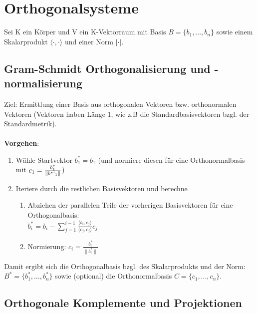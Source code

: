 \documentclass[10pt,a4paper]{article}
\newcommand{\norm}[1]{\lVert#1\rVert}
\begin{document}
	\newpage
	\section{Orthogonalsysteme}
	\label{os:sec:orthogonalsysteme}
	
	Sei K ein Körper und V ein K-Vektorraum mit Basis $B = \{b_1, ..., b_n\}$ sowie einem Skalarprodukt $\langle \cdot, \cdot\rangle$ und einer Norm $|\cdot|$.
	
	\subsection{Gram-Schmidt Orthogonalisierung und -normalisierung}
	\label{os:sub:gram_schmidt_orthogonalisierung_und_normalisierung}
	
	Ziel: Ermittlung einer Basis aus orthogonalen Vektoren bzw. orthonormalen Vektoren (Vektoren haben Länge 1, wie z.B die Standardbasisvektoren bzgl. der Standardmetrik).\\\\
	\textbf{Vorgehen}:
	\begin{enumerate}
		\item Wähle Startvektor $b^*_1 = b_1$ (und normiere diesen für eine Orthonormalbasis mit $c_1 =  \frac{b^*_1}{\norm{b^*`_1}}$)
		\item Iteriere durch die restlichen Basisvektoren und berechne
		\begin{enumerate}
			\item Abziehen der parallelen Teile der vorherigen Basisvektoren für eine Orthogonalbasis:\\$b^*_i = b_i - \sum_{j = 1}^{i - 1} \frac{\langle b_i, c_j\rangle}{\langle c_j, c_j\rangle}c_j$
			\item Normierung: $c_i = \frac{b^*_i}{\norm{b^*_i}}$
		\end{enumerate}
	\end{enumerate}
	Damit ergibt sich die Orthogonalbasis bzgl. des Skalarprodukts und der Norm: $B^* = \{b^*_1, ..., b^*_n\}$ sowie (optional) die Orthonormalbasis $C = \{c_1, ..., c_n\}$.
	
	\subsection{Orthogonale Komplemente und Projektionen}
	\label{sub:orthogonale_komplemente_und_projektionen}
	
\end{document}
